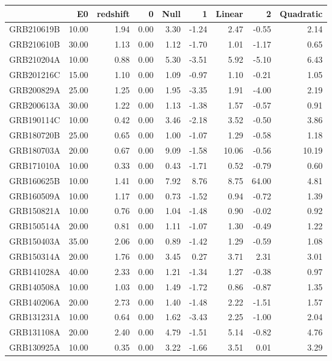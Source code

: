 \begin{tabular}{lrrrrrrrr}
\toprule
 & E0 & redshift & 0 & Null & 1 & Linear & 2 & Quadratic \\
\midrule
GRB210619B & 10.00 & 1.94 & 0.00 & 3.30 & -1.24 & 2.47 & -0.55 & 2.14 \\
GRB210610B & 30.00 & 1.13 & 0.00 & 1.12 & -1.70 & 1.01 & -1.17 & 0.65 \\
GRB210204A & 10.00 & 0.88 & 0.00 & 5.30 & -3.51 & 5.92 & -5.10 & 6.43 \\
GRB201216C & 15.00 & 1.10 & 0.00 & 1.09 & -0.97 & 1.10 & -0.21 & 1.05 \\
GRB200829A & 25.00 & 1.25 & 0.00 & 1.95 & -3.35 & 1.91 & -4.00 & 2.19 \\
GRB200613A & 30.00 & 1.22 & 0.00 & 1.13 & -1.38 & 1.57 & -0.57 & 0.91 \\
GRB190114C & 10.00 & 0.42 & 0.00 & 3.46 & -2.18 & 3.52 & -0.50 & 3.86 \\
GRB180720B & 25.00 & 0.65 & 0.00 & 1.00 & -1.07 & 1.29 & -0.58 & 1.18 \\
GRB180703A & 20.00 & 0.67 & 0.00 & 9.09 & -1.58 & 10.06 & -0.56 & 10.19 \\
GRB171010A & 10.00 & 0.33 & 0.00 & 0.43 & -1.71 & 0.52 & -0.79 & 0.60 \\
GRB160625B & 10.00 & 1.41 & 0.00 & 7.92 & 8.76 & 8.75 & 64.00 & 4.81 \\
GRB160509A & 10.00 & 1.17 & 0.00 & 0.73 & -1.52 & 0.94 & -0.72 & 1.39 \\
GRB150821A & 10.00 & 0.76 & 0.00 & 1.04 & -1.48 & 0.90 & -0.02 & 0.92 \\
GRB150514A & 20.00 & 0.81 & 0.00 & 1.11 & -1.07 & 1.30 & -0.49 & 1.22 \\
GRB150403A & 35.00 & 2.06 & 0.00 & 0.89 & -1.42 & 1.29 & -0.59 & 1.08 \\
GRB150314A & 20.00 & 1.76 & 0.00 & 3.45 & 0.27 & 3.71 & 2.31 & 3.01 \\
GRB141028A & 40.00 & 2.33 & 0.00 & 1.21 & -1.34 & 1.27 & -0.38 & 0.97 \\
GRB140508A & 10.00 & 1.03 & 0.00 & 1.49 & -1.72 & 0.86 & -0.87 & 1.35 \\
GRB140206A & 20.00 & 2.73 & 0.00 & 1.40 & -1.48 & 2.22 & -1.51 & 1.57 \\
GRB131231A & 10.00 & 0.64 & 0.00 & 1.62 & -3.43 & 2.25 & -1.00 & 2.04 \\
GRB131108A & 20.00 & 2.40 & 0.00 & 4.79 & -1.51 & 5.14 & -0.82 & 4.76 \\
GRB130925A & 10.00 & 0.35 & 0.00 & 3.22 & -1.66 & 3.51 & 0.01 & 3.29 \\

\end{tabular}
